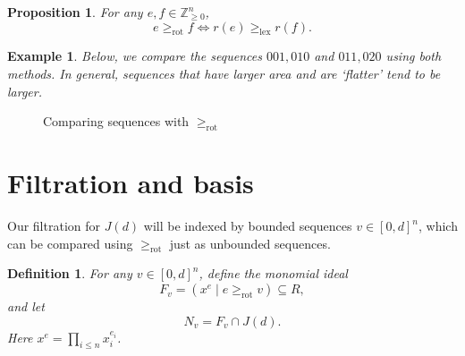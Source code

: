 \documentclass[submission]{FPSAC2027}
\newcommand{\Z}{\mathbb{Z}}
\newcommand{\rot}{\geq_{\mathrm{rot}}}
\newcommand{\rotgeq}{\geq_{\mathrm{rot}}}
\newcommand{\rotleq}{\leq_{\mathrm{rot}}}
\newtheorem{defn}[thm]{Definition}
\newtheorem{example}[thm]{Example}
\newtheorem{prop}[thm]{Proposition}
\begin{document}
\begin{prop}
\label{prop: binary rot order}
    For any $e, f \in \Z_{\geq 0}^n$, 
    $$e \rot f \iff r(e) \geq_{\mathrm{lex}} r(f).$$
\end{prop}

\begin{example}
    \label{rot example}
    Below, we compare the sequences $001, 010$ and $011, 020$ using both methods. In general, sequences that have larger area and are `flatter' tend to be larger.
\end{example}

\begin{figure}[H]
    \centering
{}
\caption{Comparing sequences with $\rot$}
\label{fig: comparing with rot}
\end{figure}

\section{Filtration and basis}
\label{sec: filtration}

Our filtration for $J(d)$ will be indexed by bounded sequences $v \in [0,d]^n$, which can be compared using $\rot$ just as unbounded sequences.

\begin{defn}
\label{defn: Fv and Mv}
    For any $v \in [0,d]^n$, define the monomial ideal
    $$F_v = (x^e \mid e \rot v) \subseteq R,$$ and let
    $$N_v = F_v \cap J(d).$$
    Here $x^e = \prod_{i \leq n} x_i^{e_i}$.
\end{defn}
\end{document}
